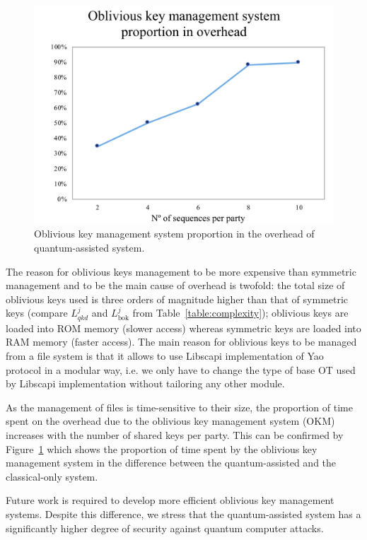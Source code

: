 \begin{figure}
    \centering
    \includegraphics[scale=0.8]{Chapter_PrivatePhylogeneticTrees/proportion_in_overhead.png}
    \caption{Oblivious key management system proportion in the overhead of quantum-assisted system.}
    \label{fig:overhead}
\end{figure}

The reason for oblivious keys management to be more expensive than symmetric management and to be the main cause of overhead is twofold: the total size of oblivious keys used is three orders of magnitude higher than that of symmetric keys (compare $L^j_{qkd}$ and $L^j_{\text{bok}}$ from Table~\ref{table:complexity}); oblivious keys are loaded into ROM memory (slower access) whereas symmetric keys are loaded into RAM memory (faster access). The main reason for oblivious keys to be managed from a file system is that it allows to use Libscapi implementation of Yao protocol in a modular way, i.e. we only have to change the type of base OT used by Libscapi implementation without tailoring any other module.

As the management of files is time-sensitive to their size, the proportion of time spent on the overhead due to the oblivious key management system (OKM) increases with the number of shared keys per party. This can be confirmed by Figure~\ref{fig:overhead} which shows the proportion of time spent by the oblivious key management system in the difference between the quantum-assisted and the classical-only system.

Future work is required to develop more efficient oblivious key management systems. Despite this difference, we stress that the quantum-assisted system has a significantly higher degree of security against quantum computer attacks.


